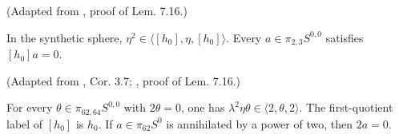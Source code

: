 \begin{theorem}
\label{frontier:Literature:dd011cab6d38}
(Adapted from \cite{LWX126}, proof of Lem. 7.16.)\par{}

In the synthetic sphere, $\eta^2\in\langle[h_0],\eta,[h_0]\rangle$. Every $a\in\pi_{2,3}S^{0,0}$ satisfies $[h_0]a=0$.

(Adapted from \cite{Toda1962}, Cor. 3.7; \cite{LWX126}, proof of Lem. 7.16.)\par{}

For every $\theta\in\pi_{62,64}S^{0,0}$ with $2\theta=0$, one has $\lambda^2\eta\theta\in\langle2,\theta,2\rangle$. The first-quotient label of $[h_0]$ is $h_0$. If $a\in\pi_{62}S^0$ is annihilated by a power of two, then $2a=0$.

\end{theorem}
